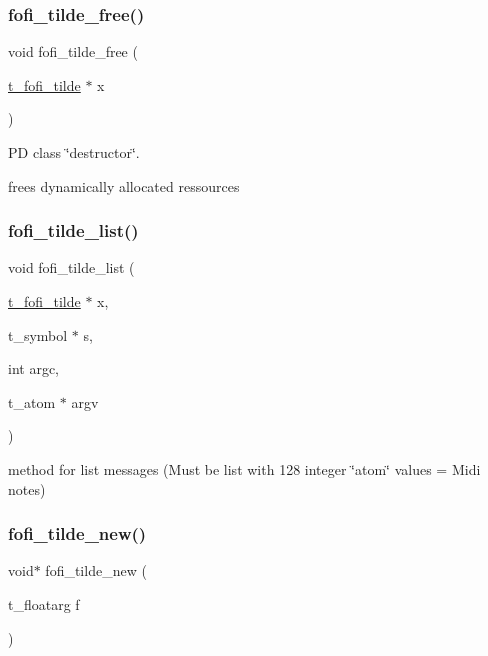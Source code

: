 \subsubsection{\texorpdfstring{fofi\_tilde\_free()}{fofi\_tilde\_free()}}
{\footnotesize\ttfamily void fofi\+\_\+tilde\+\_\+free (\begin{DoxyParamCaption}\item[{\mbox{\hyperlink{fofi~_8h_a9d4d0a864b5185ebc589d41112da08ce}{t\+\_\+fofi\+\_\+tilde}} $\ast$}]{x }\end{DoxyParamCaption})}



PD class \char`\"{}destructor\char`\"{}. 

frees dynamically allocated ressources \mbox{\label{fofi~_8c_a83449b8d535886ef9d7ecd42146932c3}} 
\subsubsection{\texorpdfstring{fofi\_tilde\_list()}{fofi\_tilde\_list()}}
{\footnotesize\ttfamily void fofi\+\_\+tilde\+\_\+list (\begin{DoxyParamCaption}\item[{\mbox{\hyperlink{fofi~_8h_a9d4d0a864b5185ebc589d41112da08ce}{t\+\_\+fofi\+\_\+tilde}} $\ast$}]{x,  }\item[{t\+\_\+symbol $\ast$}]{s,  }\item[{int}]{argc,  }\item[{t\+\_\+atom $\ast$}]{argv }\end{DoxyParamCaption})}



method for list messages (Must be list with 128 integer \char`\"{}atom\char`\"{} values = Midi notes) 

\mbox{\label{fofi~_8c_a523787a74d7b8f02c80d1e0cc0468699}} 
\subsubsection{\texorpdfstring{fofi\_tilde\_new()}{fofi\_tilde\_new()}}
{\footnotesize\ttfamily void$\ast$ fofi\+\_\+tilde\+\_\+new (\begin{DoxyParamCaption}\item[{t\+\_\+floatarg}]{f }\end{DoxyParamCaption})}



